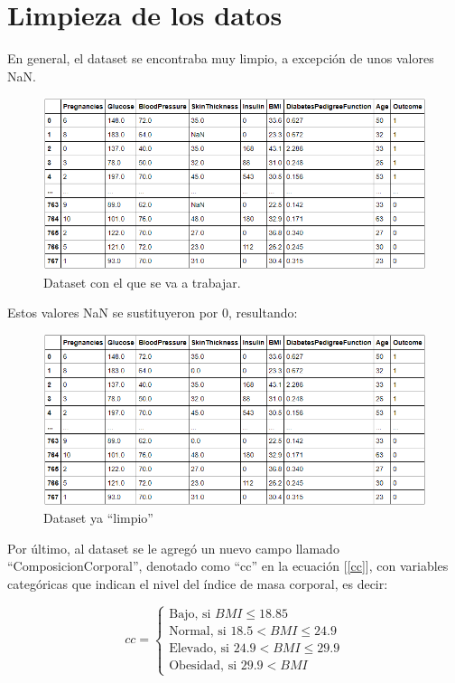 \documentclass{article}
\begin{document}
\section{Limpieza de los datos}

En general, el dataset se encontraba muy limpio, a excepción de unos valores NaN.

\begin{figure}[H]
	\centering
	\includegraphics[width=0.9\linewidth]{dataset_sucio.png}
	\caption{Dataset con el que se va a trabajar.}%
	\label{fig:dataset_sucio}
\end{figure}

Estos valores NaN se sustituyeron por $0$, resultando:

\begin{figure}[H]
	\centering
	\includegraphics[width=0.9\linewidth]{dataset_limpio.png}
	\caption{Dataset ya ``limpio''}%
	\label{fig:dataset_limpio}
\end{figure}

Por último, al dataset se le agregó un nuevo campo llamado ``ComposicionCorporal'', denotado como ``cc'' en la ecuación [\ref{cc}], con variables categóricas que indican el nivel del índice de masa corporal, es decir:

\begin{equation}\label{cc}
	cc=
	\begin{cases}
		\text{Bajo, si      } BMI \leq 18.85\\
		\text{Normal, si    } 18.5 < BMI \leq 24.9\\
		\text{Elevado, si   } 24.9 < BMI \leq 29.9\\
		\text{Obesidad, si  } 29.9 < BMI
	\end{cases}
\end{equation}
\end{document}
